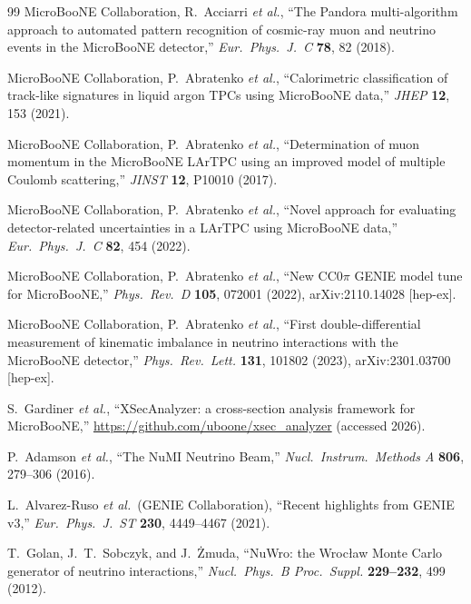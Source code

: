 \documentclass[11pt,a4paper]{article}
\begin{document}
\begin{thebibliography}{99}
  MicroBooNE Collaboration, R.~Acciarri \textit{et al.},
  ``The Pandora multi-algorithm approach to automated pattern recognition of
  cosmic-ray muon and neutrino events in the MicroBooNE detector,''
  \textit{Eur.\ Phys.\ J.\ C} \textbf{78}, 82 (2018).

  MicroBooNE Collaboration, P.~Abratenko \textit{et al.},
  ``Calorimetric classification of track-like signatures in liquid argon TPCs
  using MicroBooNE data,''
  \textit{JHEP} \textbf{12}, 153 (2021).

  MicroBooNE Collaboration, P.~Abratenko \textit{et al.},
  ``Determination of muon momentum in the MicroBooNE LArTPC using an improved
  model of multiple Coulomb scattering,''
  \textit{JINST} \textbf{12}, P10010 (2017).

  MicroBooNE Collaboration, P.~Abratenko \textit{et al.},
  ``Novel approach for evaluating detector-related uncertainties in a LArTPC
  using MicroBooNE data,''
  \textit{Eur.\ Phys.\ J.\ C} \textbf{82}, 454 (2022).

  MicroBooNE Collaboration, P.~Abratenko \textit{et al.},
  ``New CC0$\pi$ GENIE model tune for MicroBooNE,''
  \textit{Phys.\ Rev.\ D} \textbf{105}, 072001 (2022), arXiv:2110.14028 [hep-ex].

  MicroBooNE Collaboration, P.~Abratenko \textit{et al.},
  ``First double-differential measurement of kinematic imbalance in neutrino
  interactions with the MicroBooNE detector,''
  \textit{Phys.\ Rev.\ Lett.} \textbf{131}, 101802 (2023), arXiv:2301.03700 [hep-ex].

  S.~Gardiner \textit{et al.},
  ``XSecAnalyzer: a cross-section analysis framework for MicroBooNE,''
  \url{https://github.com/uboone/xsec_analyzer} (accessed 2026).

  P.~Adamson \textit{et al.},
  ``The NuMI Neutrino Beam,''
  \textit{Nucl.\ Instrum.\ Methods A} \textbf{806}, 279--306 (2016).

  L.~Alvarez-Ruso \textit{et al.}\ (GENIE Collaboration),
  ``Recent highlights from GENIE v3,''
  \textit{Eur.\ Phys.\ J.\ ST} \textbf{230}, 4449--4467 (2021).

  T.~Golan, J.~T.~Sobczyk, and J.~\.Zmuda,
  ``NuWro: the Wroc\l{}aw Monte Carlo generator of neutrino interactions,''
  \textit{Nucl.\ Phys.\ B Proc.\ Suppl.} \textbf{229--232}, 499 (2012).


\end{thebibliography}
\end{document}
